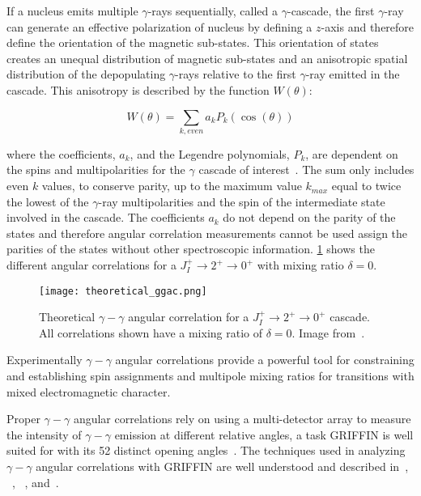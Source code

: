 \documentclass[cnatzke_thesis_proposal.tex]{subfiles}
\begin{document}
If a nucleus emits multiple $\gamma$-rays sequentially, called a $\gamma$-cascade, the first $\gamma$-ray can generate an effective polarization of nucleus by defining a $z$-axis and therefore define the orientation of the magnetic sub-states. 
This orientation of states creates an unequal distribution of magnetic sub-states and an anisotropic spatial distribution of the depopulating $\gamma$-rays relative to the first $\gamma$-ray emitted in the cascade. 
This anisotropy is described by the function $W(\theta)$: 

\begin{equation}
  W(\theta) = \sum_{k, even} a_k P_k(\cos(\theta))
\end{equation}

where the coefficients, $a_k$, and the Legendre polynomials, $P_k$, are dependent on the spins and multipolarities for the $\gamma$ cascade of interest~\cite{krane_introductory_1987}. 
The sum only includes even $k$ values, to conserve parity, up to the maximum value $k_{max}$ equal to twice the lowest of the $\gamma$-ray multipolarities and the spin of the intermediate state involved in the cascade. 
The coefficients $a_k$ do not depend on the parity of the states and therefore angular correlation measurements cannot be used assign the parities of the states without other spectroscopic information. 
\ref{fig:angular_correlation_theory} shows the different angular correlations for a  $J_I^+ \rightarrow 2^+ \rightarrow 0^+$ with mixing ratio $\delta = 0$.

\begin{figure}[htbp]
  \centering
  \texttt{[image: theoretical\_ggac.png]}
  \caption{Theoretical $\gamma-\gamma$ angular correlation for a $J_I^+ \rightarrow 2^+ \rightarrow 0^+$ cascade. All correlations shown have a mixing ratio of $\delta = 0$. Image from~\cite{maclean_spectroscopy_2021}.}
  \label{fig:angular_correlation_theory}
\end{figure}

Experimentally $\gamma-\gamma$ angular correlations provide a powerful tool for constraining and establishing spin assignments and multipole mixing ratios for transitions with mixed electromagnetic character. 

Proper $\gamma-\gamma$ angular correlations rely on using a multi-detector array to measure the intensity of $\gamma-\gamma$ emission at different relative angles, a task GRIFFIN is well suited for with its 52 distinct opening angles~\cite{smith_gamma-gamma_2019}.
The techniques used in analyzing $\gamma-\gamma$ angular correlations with GRIFFIN are well understood and described in~\cite{smith_gamma-gamma_2019}, ~\cite{smith_spectroscopic_2020}, ~\cite{maclean_high-precision_2020}, and~\cite{porzio_configuration_2021}.
\end{document}
